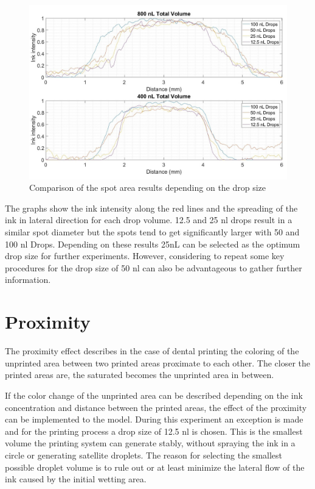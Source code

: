 \begin{figure}[H]
	\centering
	\includegraphics[width=1\textwidth]{grafiken/SpotArea.jpg}
	\caption{Comparison of the spot area results depending on the drop size}
	\label{fig:SpotArea}
\end{figure} 

\bigskip

The graphs show the ink intensity along the red lines and the spreading of the ink in lateral direction for each drop volume. 12.5 and 25 nl drops result in a similar spot diameter but the spots tend to get significantly larger with 50 and 100 nl Drops. Depending on these results 25nL can be selected as the optimum drop size for further experiments. However, considering to repeat some key procedures for the drop size of 50 nl can also be advantageous to gather further information.

\section{Proximity}

The proximity effect describes in the case of dental printing the coloring of the unprinted area between two printed areas proximate to each other. The closer the printed areas are, the saturated becomes the unprinted area in between.

If the color change of the unprinted area can be described depending on the ink concentration and distance between the printed areas, the effect of the proximity can be implemented to the model. During this experiment an exception is made and for the printing process a drop size of 12.5 nl is chosen. This is the smallest volume the printing system can generate stably, without spraying the ink in a circle or generating satellite droplets. The reason for selecting the smallest possible droplet volume is to rule out or at least minimize the lateral flow of the ink caused by the initial wetting area.  

